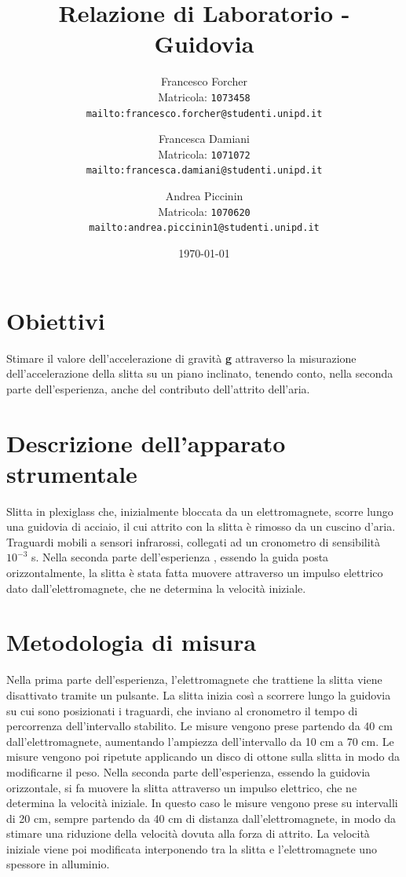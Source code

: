 \documentclass[12pt]{article} %
\title {Relazione di Laboratorio - Guidovia}
\author{Francesco Forcher\\
Matricola: \texttt{1073458}\\
\texttt{mailto:francesco.forcher@studenti.unipd.it}\\
\and
Francesca Damiani\\ 
Matricola: \texttt{1071072}\\
\texttt{mailto:francesca.damiani@studenti.unipd.it}\\
\and
Andrea Piccinin\\ 
Matricola: \texttt{1070620}\\
\texttt{mailto:andrea.piccinin1@studenti.unipd.it}\\
}
\date{\today}
\begin{document}
\maketitle %
\newpage
\tableofcontents %



        
\newpage
\section{Obiettivi}
	Stimare il valore dell'accelerazione di gravità \textbf{g} attraverso la misurazione dell'accelerazione della slitta su un piano 
	inclinato, tenendo conto, nella seconda parte dell'esperienza, anche del contributo dell'attrito dell'aria.

\section{Descrizione dell'apparato strumentale}
	Slitta in plexiglass che, inizialmente bloccata da un elettromagnete, scorre lungo una guidovia di acciaio, il cui attrito con la slitta è rimosso da un cuscino d'aria. 
	Traguardi mobili a sensori infrarossi, collegati ad un cronometro di sensibilità \(10^{-3}\) s.
	Nella seconda parte dell'esperienza , essendo la guida posta orizzontalmente, la slitta è stata fatta muovere attraverso un impulso elettrico dato dall'elettromagnete, che ne determina la velocità iniziale. 
	

\section{Metodologia di misura}
	Nella prima parte dell'esperienza, l'elettromagnete che trattiene la slitta viene disattivato tramite un pulsante. La slitta inizia così a scorrere lungo la guidovia su cui sono posizionati i traguardi, che inviano al cronometro il tempo di percorrenza 		dell'intervallo stabilito. Le misure vengono prese partendo da 40 cm dall'elettromagnete, aumentando l'ampiezza dell'intervallo da 10 		cm a 70 cm. Le misure vengono poi ripetute applicando un disco di ottone sulla slitta in modo da modificarne il peso.
	Nella seconda parte dell'esperienza, essendo la guidovia orizzontale, si fa muovere la slitta attraverso un impulso elettrico, che ne determina la velocità iniziale. In questo caso le misure vengono prese su intervalli di 20 cm, sempre partendo da 40 cm di distanza 		dall'elettromagnete, in modo da stimare una riduzione della velocità dovuta alla forza di attrito. La velocità iniziale viene poi 		modificata interponendo tra la slitta e l'elettromagnete uno spessore in alluminio.
\end{document}
